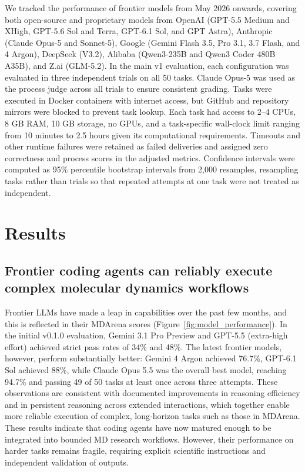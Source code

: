  We tracked the performance of frontier models from May 2026 onwards, covering both open-source and proprietary models from OpenAI (GPT-5.5 Medium and XHigh, GPT-5.6 Sol and Terra, GPT-6.1 Sol, and GPT Astra), Anthropic (Claude Opus-5 and Sonnet-5), Google (Gemini Flash 3.5, Pro 3.1, 3.7 Flash, and 4 Argon), DeepSeek (V3.2), Alibaba (Qwen3-235B and Qwen3 Coder 480B A35B), and Z.ai (GLM-5.2). In the main v1 evaluation, each configuration was evaluated in three independent trials on all 50 tasks. Claude Opus-5 was used as the process judge across all trials to ensure consistent grading. Tasks were executed in Docker containers with internet access, but GitHub and repository mirrors were blocked to prevent task lookup. Each task had access to 2–4 CPUs, 8 GB RAM, 10 GB storage, no GPUs, and a task-specific wall-clock limit ranging from 10 minutes to 2.5 hours given its computational requirements. Timeouts and other runtime failures were retained as failed deliveries and assigned zero correctness and process scores in the adjusted metrics. Confidence intervals were computed as 95\% percentile bootstrap intervals from 2,000 resamples, resampling tasks rather than trials so that repeated attempts at one task were not treated as independent.



\section{Results}

\subsection[Reliable execution of complex MD workflows]{Frontier coding agents can reliably execute complex molecular dynamics workflows}

Frontier LLMs have made a leap in capabilities over the past few months, and this is reflected in their MDArena scores (Figure~\ref{fig:model_performance}). In the initial v0.1.0 evaluation, Gemini 3.1 Pro Preview and GPT-5.5 (extra-high effort) achieved strict pass rates of 34\% and 48\%. The latest frontier models, however, perform substantially better: Gemini 4 Argon achieved 76.7\%, GPT-6.1 Sol achieved 88\%, while Claude Opus 5.5 was the overall best model, reaching 94.7\% and passing 49 of 50 tasks at least once across three attempts. These observations are consistent with documented improvements in reasoning efficiency and in persistent reasoning across extended interactions, which together enable more reliable execution of complex, long-horizon tasks such as those in MDArena. These results indicate that coding agents have now matured enough to be integrated into bounded MD research workflows. However, their performance on harder tasks remains fragile, requiring explicit scientific instructions and independent validation of outputs.



